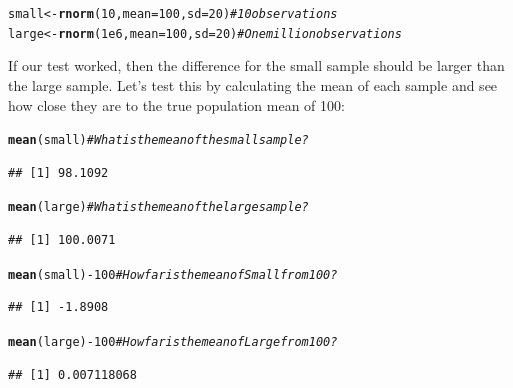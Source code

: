 \documentclass{tufte-book}\usepackage[]{graphicx}\usepackage[]{color}
\makeatletter
\newcommand{\hlnum}[1]{\textcolor[rgb]{0.686,0.059,0.569}{#1}}%
\newcommand{\hlcom}[1]{\textcolor[rgb]{0.678,0.584,0.686}{\textit{#1}}}%
\newcommand{\hlopt}[1]{\textcolor[rgb]{0,0,0}{#1}}%
\newcommand{\hlstd}[1]{\textcolor[rgb]{0.345,0.345,0.345}{#1}}%
\newcommand{\hlkwb}[1]{\textcolor[rgb]{0.69,0.353,0.396}{#1}}%
\newcommand{\hlkwc}[1]{\textcolor[rgb]{0.333,0.667,0.333}{#1}}%
\newcommand{\hlkwd}[1]{\textcolor[rgb]{0.737,0.353,0.396}{\textbf{#1}}}%
\newenvironment{kframe}{%
 \def\at@end@of@kframe{}%
 \ifinner\ifhmode%
  \def\at@end@of@kframe{\end{minipage}}%
  \begin{minipage}{\columnwidth}%
 \fi\fi%
 \def\FrameCommand##1{\hskip\@totalleftmargin \hskip-\fboxsep
 \colorbox{shadecolor}{##1}\hskip-\fboxsep
     \hskip-\linewidth \hskip-\@totalleftmargin \hskip\columnwidth}%
 \MakeFramed {\advance\hsize-\width
   \@totalleftmargin\z@ \linewidth\hsize
   \@setminipage}}%
 {\par\unskip\endMakeFramed%
 \at@end@of@kframe}
\newenvironment{knitrout}{}{} %
\makeatother
\begin{document}
\begin{footnotesize}
\begin{knitrout}
\color{fgcolor}\begin{kframe}
\begin{alltt}
\hlstd{small} \hlkwb{<-} \hlkwd{rnorm}\hlstd{(}\hlnum{10}\hlstd{,} \hlkwc{mean} \hlstd{=} \hlnum{100}\hlstd{,} \hlkwc{sd} \hlstd{=} \hlnum{20}\hlstd{)} \hlcom{# 10 observations}
\hlstd{large} \hlkwb{<-} \hlkwd{rnorm}\hlstd{(}\hlnum{1e6}\hlstd{,} \hlkwc{mean} \hlstd{=} \hlnum{100}\hlstd{,} \hlkwc{sd} \hlstd{=} \hlnum{20}\hlstd{)} \hlcom{# One million observations}
\end{alltt}
\end{kframe}
\end{knitrout}
\end{footnotesize}

If our test worked, then the difference for the small sample should be larger than the large sample. Let's test this by calculating the mean of each sample and see how close they are to the true population mean of 100:

\begin{footnotesize}
\begin{knitrout}
\color{fgcolor}\begin{kframe}
\begin{alltt}
\hlkwd{mean}\hlstd{(small)} \hlcom{# What is the mean of the small sample?}
\end{alltt}
\begin{verbatim}
## [1] 98.1092
\end{verbatim}
\begin{alltt}
\hlkwd{mean}\hlstd{(large)} \hlcom{# What is the mean of the large sample?}
\end{alltt}
\begin{verbatim}
## [1] 100.0071
\end{verbatim}
\begin{alltt}
\hlkwd{mean}\hlstd{(small)} \hlopt{-} \hlnum{100} \hlcom{# How far is the mean of Small from 100?}
\end{alltt}
\begin{verbatim}
## [1] -1.8908
\end{verbatim}
\begin{alltt}
\hlkwd{mean}\hlstd{(large)} \hlopt{-} \hlnum{100} \hlcom{# How far is the mean of Large from 100?}
\end{alltt}
\begin{verbatim}
## [1] 0.007118068
\end{verbatim}
\end{kframe}
\end{knitrout}
\end{footnotesize}
\end{document}
